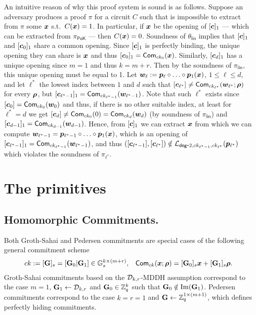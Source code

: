 An intuitive reason of why this proof system is sound is as follows. Suppose an adversary produces a proof $\pi$ for a circuit $C$ such that is impossible to extract from $\pi$ some ${\boldsymbol{x}}$ s.t.~$C({\boldsymbol{x}})=1$. In particular, if ${\boldsymbol{x}}$ be the opening of $[{\boldsymbol{c}}]_1$ --- which can be extracted from $\pi_\mathsf{PoK}$ --- then $C({\boldsymbol{x}})=0$. Soundness of $\theta_\mathsf{lin}$ implies that $[{\boldsymbol{c}}]_1$ and $[{\boldsymbol{c}}_{0}]_1$ share a common opening. Since $[{\boldsymbol{c}}]_1$ is perfectly binding, the unique opening they can share is ${\boldsymbol{x}}$ and thus $[{\boldsymbol{c}}_{0}]_1=\mathsf{Com}_{ck_{0}}({\boldsymbol{x}})$. Similarly, $[{\boldsymbol{c}}_d]_1$ has a unique opening since $m=1$ and thus $k=m+r$. Then by the soundness of $\pi_\mathsf{lin}$, this unique opening must be equal to 1.
Let ${\boldsymbol{w}}_\ell := {\boldsymbol{p}}_\ell\circ\ldots\circ {\boldsymbol{p}}_1({\boldsymbol{x}})$, $1\leq\ell\leq d$, and let $\ell^*$ the lowest index between $1$ and $d$ such that $[{\boldsymbol{c}}_{\ell^*}]\neq\mathsf{Com}_{ck_{\ell^*}}({\boldsymbol{w}}_{\ell^*};{\boldsymbol{\rho}})$ for every ${\boldsymbol{\rho}}$, but $[{\boldsymbol{c}}_{\ell^*-1}]_1 = \mathsf{Com}_{ck_{\ell^*-1}}({\boldsymbol{w}}_{\ell^*-1})$. Note that such $\ell^*$ exists since $[{\boldsymbol{c}}_0] = \mathsf{Com}_{ck_0}({\boldsymbol{w}}_0)$ and thus, if there is no other suitable index, at least for $\ell^*=d$ we get $[{\boldsymbol{c}}_d]\neq\mathsf{Com}_{ck_0}(0)=\mathsf{Com}_{ck_d}({\boldsymbol{w}}_d)$ (by soundness of $\pi_\mathsf{lin}$) and $[{\boldsymbol{c}}_{d-1}]_1=\mathsf{Com}_{ck_{d-1}}({\boldsymbol{w}}_{d-1})$. Hence, from $[{\boldsymbol{c}}]_1$ we can extract ${\boldsymbol{x}}$ from which we can compute ${\boldsymbol{w}}_{\ell^*-1} = {\boldsymbol{p}}_{\ell^*-1}\circ\ldots\circ {\boldsymbol{p}}_{1}({\boldsymbol{x}})$, which is an opening of $[{\boldsymbol{c}}_{\ell^*-1}]_1=\mathsf{Com}_{ck_{\ell^*-1}}({\boldsymbol{w}}_{\ell^*-1})$, and thus $([{\boldsymbol{c}}_{\ell^*-1}],[{\boldsymbol{c}}_{\ell^*}])\notin\mathcal{L}_{\mathsf{deg}\mbox{-}2,ck_{\ell^*-1},ck_{\ell^*}}({\boldsymbol{p}}_{\ell^*})$ which violates the soundness of $\pi_{\ell^*}$.

\section{The primitives}

\subsection{Homomorphic Commitments.}
Both Groth-Sahai and Pedersen commitments are special cases of the following general commitment scheme
\begin{align*}
&ck:=[\mathbf{{G}}]_s=[\mathbf{{G}}_0|\mathbf{{G}}_1]\in\mathbb{G}_s^{k\times (m+r)},
& \mathsf{Com}_{ck}({\boldsymbol{x}};{\boldsymbol{\rho}})=[\mathbf{{G}}_0]_s{\boldsymbol{x}}+[\mathbf{{G}}_1]_s{\boldsymbol{\rho}}.
\end{align*}
Groth-Sahai commitments based on the $\mathcal{D}_{k,r}$-MDDH assumption correspond to the case $m=1$, $\mathbf{{G}}_1\gets\mathcal{D}_{k,r}$ and $\mathbf{{G}}_0\in\mathbb{Z}_q^k$ such that $\mathbf{{G}}_0\notin\mathrm{Im}(\mathbf{{G}}_1)$. Pedersen commitments correspond to the case $k=r=1$ and $\mathbf{{G}}\gets\mathbb{Z}_q^{1\times(m+1)}$, which defines perfectly hiding commitments.

